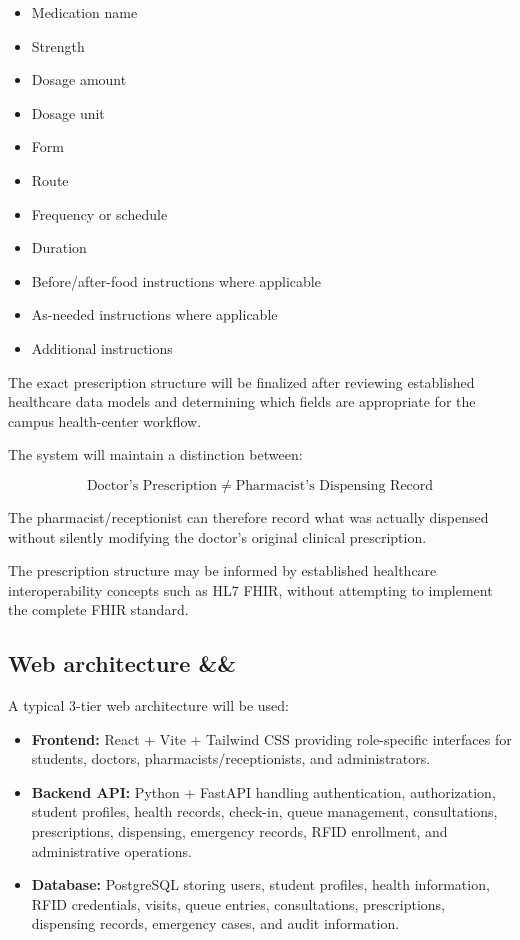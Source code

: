 \documentclass[11pt,a4paper]{article}
\newcommand{\BvrHint}[1]{%
  \ifx&#1&%
  \else
    {\normalfont\normalsize\itshape\hfill #1}%
  \fi}
\begin{document}
\begin{itemize}

    \item Medication name
    \item Strength
    \item Dosage amount
    \item Dosage unit
    \item Form
    \item Route
    \item Frequency or schedule
    \item Duration
    \item Before/after-food instructions where applicable
    \item As-needed instructions where applicable
    \item Additional instructions

\end{itemize}

The exact prescription structure will be finalized after reviewing established healthcare data models and determining which fields are appropriate for the campus health-center workflow.

The system will maintain a distinction between:

\[
\text{Doctor's Prescription}
\;\neq\;
\text{Pharmacist's Dispensing Record}
\]

The pharmacist/receptionist can therefore record what was actually dispensed without silently modifying the doctor's original clinical prescription.

The prescription structure may be informed by established healthcare interoperability concepts such as HL7 FHIR, without attempting to implement the complete FHIR standard.

\subsection{Web architecture %
\BvrHint{}}

A typical 3-tier web architecture will be used:

\begin{itemize}

    \item \textbf{Frontend:} React + Vite + Tailwind CSS providing role-specific interfaces for students, doctors, pharmacists/receptionists, and administrators.

    \item \textbf{Backend API:} Python + FastAPI handling authentication, authorization, student profiles, health records, check-in, queue management, consultations, prescriptions, dispensing, emergency records, RFID enrollment, and administrative operations.

    \item \textbf{Database:} PostgreSQL storing users, student profiles, health information, RFID credentials, visits, queue entries, consultations, prescriptions, dispensing records, emergency cases, and audit information.

\end{itemize}
\end{document}
